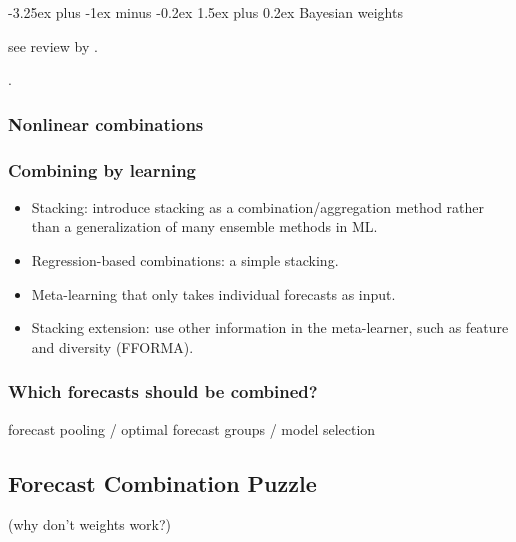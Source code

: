 \documentclass[11pt]{article}
\makeatletter
\renewcommand{\paragraph}{\@startsection{paragraph}{4}{0ex}%
   {-3.25ex plus -1ex minus -0.2ex}%
   {1.5ex plus 0.2ex}%
   {\normalfont\normalsize\bfseries}}
\makeatother
\begin{document}
\paragraph{Bayesian weights}

see review by \cite{Cheng2015-tp}.

\citep{Bunn1975-mg,Clemen1993-ey,Nowotarski2014-ev}.



\subsubsection{Nonlinear combinations}


\subsubsection{Combining by learning}
\begin{itemize}
 \item Stacking: introduce stacking as a combination/aggregation method rather than a generalization of many ensemble methods in ML.
 \item Regression-based combinations: a simple stacking.
 \item Meta-learning that only takes individual forecasts as input.
 \item Stacking extension: use other information in the meta-learner, such as feature and diversity (FFORMA).
\end{itemize}

\subsubsection{Which forecasts should be combined?}

forecast pooling / optimal forecast groups / model selection
\citep{Zhou2002-cg,Kourentzes2019-na}



\subsection{Forecast Combination Puzzle}
{\color{red} (why don't weights work?)}

\citep{Kang1986-kq,De_Menezes2000-vd,Genre2013-ut,Post2019-lv,Chan2018-jl,Lichtendahl2020-ut,Kourentzes2019-na}
\end{document}
